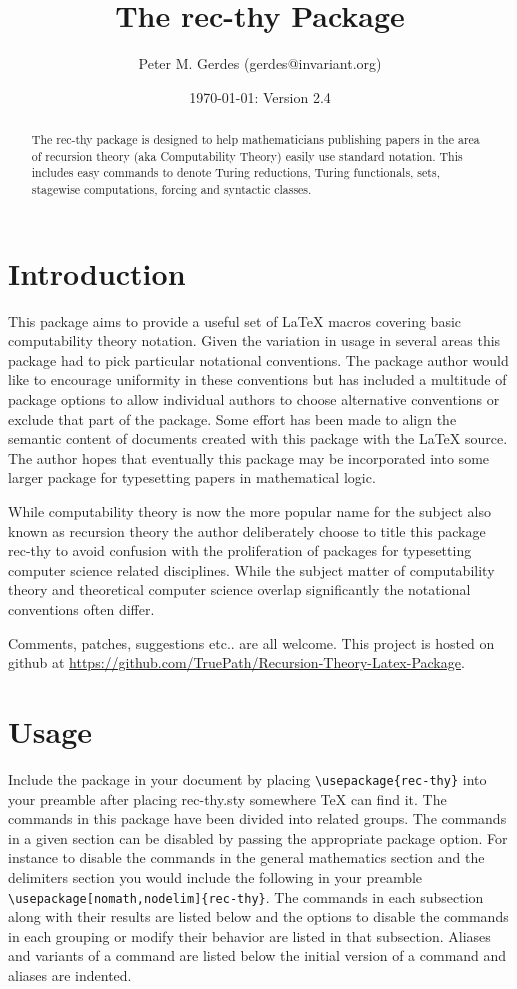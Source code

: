 \documentclass[leqno,11pt]{amsart}
\title{The rec-thy Package}
\author{Peter M. Gerdes (gerdes@invariant.org)}
\date{\today: Version 2.4}
\begin{document}
\maketitle


\begin{abstract}
\noindent The rec-thy package is designed to help mathematicians publishing papers in the area of recursion theory (aka Computability Theory) easily use standard notation.  This includes easy commands to denote Turing reductions, Turing functionals, \ce sets, stagewise computations, forcing and syntactic classes.
\end{abstract}



\section{Introduction}
This package aims to provide a useful set of \LaTeX { }macros covering basic computability theory notation.  Given the variation in usage in several areas this package had to pick particular notational conventions.  The package author would like to encourage uniformity in these conventions but has included a multitude of package options to allow individual authors to choose alternative conventions or exclude that part of the package.  Some effort has been made to align the semantic content of documents created with this package with the \LaTeX { }source.  The author hopes that eventually this package may be incorporated into some larger package for typesetting papers in mathematical logic.

While computability theory is now the more popular name for the subject also known as recursion theory the author deliberately choose to title this package rec-thy to avoid confusion with the proliferation of packages for typesetting computer science related disciplines.  While the subject matter of computability theory and theoretical computer science overlap significantly the notational conventions often differ.

Comments, patches, suggestions etc.. are all welcome.  This project is hosted on github at \href{https://github.com/TruePath/Recursion-Theory-Latex-Package}{https://github.com/TruePath/Recursion-Theory-Latex-Package}.

\section{Usage}
Include the package in your document by placing \verb=\usepackage{rec-thy}= into your preamble after placing rec-thy.sty somewhere \TeX{ } can find it.  The commands in this package have been divided into related groups.  The commands in a given section can be disabled by passing the appropriate package option.  For instance to disable the commands in the general mathematics section and the delimiters section you would include the following in your preamble \verb=\usepackage[nomath,nodelim]{rec-thy}=.  The commands in each subsection along with their results are listed below and the options to disable the commands in each grouping or modify their behavior are listed in that subsection.  Aliases and variants of a command are listed below the initial version of a command and aliases are indented.
\end{document}
